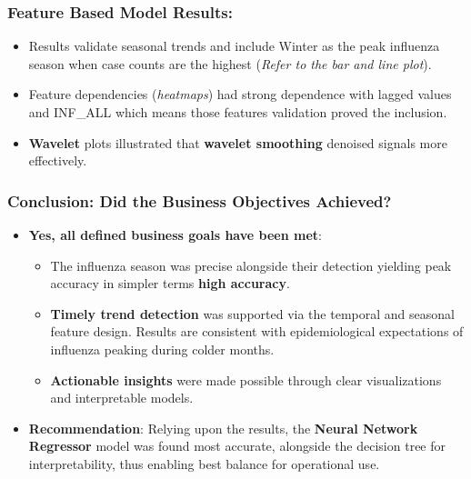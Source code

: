 \subsubsection*{Feature Based Model Results:}
\begin{itemize}
  \item Results validate seasonal trends and include Winter as the peak influenza season when case counts are the highest (\emph{Refer to the bar and line plot}).
  \item Feature dependencies (\emph{heatmaps}) had strong dependence with lagged values and INF\_ALL which means those features validation proved the inclusion.
  \item \textbf{Wavelet} plots illustrated that \textbf{wavelet smoothing} denoised signals more effectively.
\end{itemize}

\subsubsection*{Conclusion: Did the Business Objectives Achieved?}

\begin{itemize}
  \item \textbf{Yes, all defined business goals have been met}:
  \begin{itemize}
    \item The influenza season was precise alongside their detection yielding peak accuracy in simpler terms \textbf{high accuracy}.
    \item \textbf{Timely trend detection} was supported via the temporal and seasonal feature design. Results are consistent with epidemiological expectations of influenza peaking during colder months.
    \item \textbf{Actionable insights} were made possible through clear visualizations and interpretable models.
  \end{itemize}
  \item \textbf{Recommendation}: Relying upon the results, the \textbf{Neural Network Regressor} model was found most accurate, alongside the decision tree for interpretability, thus enabling best balance for operational use.
\end{itemize}
